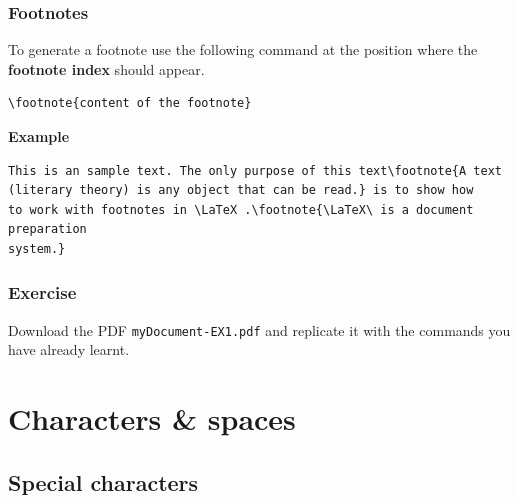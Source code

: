 \begin{frame}[fragile]
\frametitle{Footnotes}

To generate a footnote use the following command at the position where the \textbf{footnote index} should appear. 

\begin{lstlisting}
\footnote{content of the footnote}
\end{lstlisting}

\noindent \textbf{Example}
\begin{lstlisting}
This is an sample text. The only purpose of this text\footnote{A text 
(literary theory) is any object that can be read.} is to show how 
to work with footnotes in \LaTeX .\footnote{\LaTeX\ is a document preparation 
system.}
\end{lstlisting}

%

\end{frame}


\begin{frame}[fragile]
\frametitle{Exercise}

Download the PDF \alert{\texttt{myDocument-EX1.pdf}} and replicate it with the commands you have already learnt.

\end{frame}


\section{Characters \& spaces}


\subsection{Special characters}

